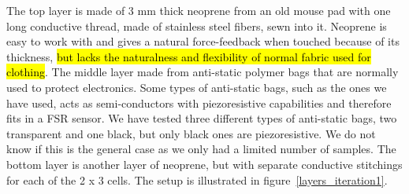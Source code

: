 The top layer is made of 3 mm thick neoprene from an old mouse pad with one long conductive thread, made of stainless steel fibers, sewn into it.
Neoprene is easy to work with and gives a natural force-feedback when touched because of its thickness, \hl{but lacks the naturalness and flexibility of normal fabric used for clothing}.
The middle layer made from anti-static polymer bags that are normally used to protect electronics. 
Some types of anti-static bags, such as the ones we have used, acts as semi-conductors with piezoresistive capabilities and therefore fits in a FSR sensor.
We have tested three different types of anti-static bags, two  transparent and one black, but only black ones are piezoresistive.
We do not know if this is the general case as we only had a limited number of samples.
The bottom layer is another layer of neoprene, but with separate conductive stitchings for each of the 2 x 3 cells.
The setup is illustrated in figure~\ref{layers_iteration1}.


